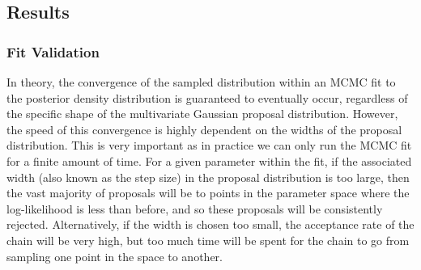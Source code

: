 
\subsection{Results}
\subsubsection{Fit Validation}
In theory, the convergence of the sampled distribution within an MCMC fit to the posterior density distribution is guaranteed to eventually occur, regardless of the specific shape of the multivariate Gaussian proposal distribution. However, the speed of this convergence is highly dependent on the widths of the proposal distribution. This is very important as in practice we can only run the MCMC fit for a finite amount of time. For a given parameter within the fit, if the associated width (also known as the step size) in the proposal distribution is too large, then the vast majority of proposals will be to points in the parameter space where the log-likelihood is less than before, and so these proposals will be consistently rejected. Alternatively,  if the width is chosen too small, the acceptance rate of the chain will be very high, but too much time will be spent for the chain to go from sampling one point in the space to another.

